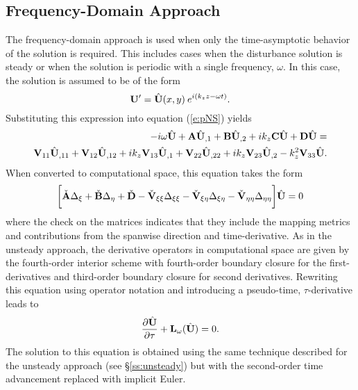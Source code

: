 \subsection{Frequency-Domain Approach \label{ss:frequency} }

The frequency-domain approach is used when only the time-asymptotic behavior
of the solution is required.  This includes cases when the disturbance
solution is steady or when the solution is periodic with a single frequency,
$\omega$.  In this case, the solution is assumed to be of the form
%
\begin{equation}
  \bU' = \bhU(x,y) \: e^{i (k_z z - \omega t)} .
\end{equation}
%
Substituting this expression into equation (\ref{e:pNS}) yields
%
\def\bhU{{\hat{\bf U}}}
\begin{eqnarray} \label{e:omegaNS}
  -i \omega \bhU + \bA \bhU_{,1} + \bB \bhU_{,2} + i k_z \bC \bhU + \bD \bhU =
  \nonumber \\
  \bVxx \bhU_{,11} + \bVxy \bhU_{,12} +
  i k_z \bVxz \bhU_{,1} + \bVyy \bhU_{,22} +
  i k_z \bVyz \bhU_{,2} - k_z^2 \bVzz \bhU .
\end{eqnarray}
%
When converted to computational space, this equation takes the form
%
\begin{eqnarray}
  \bigg[ 
  \check\bA \Delta_{\xi} + 
  \check\bB \Delta_{\eta} + 
  \check\bD -
  \check{\bf V}_{\xi\xi}   \Delta_{\xi\xi}  - 
  \check{\bf V}_{\xi\eta}  \Delta_{\xi\eta} -
  \check{\bf V}_{\eta\eta} \Delta_{\eta\eta} 
  \bigg] \bhU = 0
\end{eqnarray}
%
where the check on the matrices indicates that they include the mapping
metrics and contributions from the spanwise direction and time-derivative.  As
in the unsteady approach, the derivative operators in computational space are
given by the fourth-order interior scheme with fourth-order boundary closure
for the first-derivatives and third-order boundary closure for second
derivatives.  Rewriting this equation using operator notation and introducing
a pseudo-time, $\tau$-derivative leads to
%
\begin{equation}
  \frac{\partial\bhU}{\partial\tau} + \bL_\omega (\bhU) = 0 .
\end{equation}
%
The solution to this equation is obtained using the same technique described
for the unsteady approach (see \S\ref{ss:unsteady}) but with the second-order
time advancement replaced with implicit Euler.  

